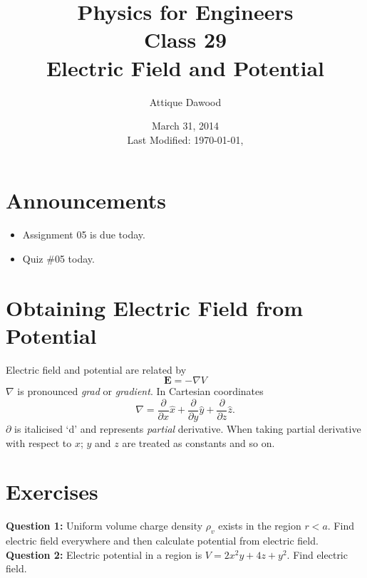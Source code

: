 \documentclass[12pt,a4paper]{article}
\title{\vspace{-3cm}Physics for Engineers\\Class 29\\Electric Field and Potential}
\author{Attique Dawood}
\date{March 31, 2014\\[0.2cm] Last Modified: \today, \currenttime}
\begin{document}
\maketitle
\section{Announcements}
\begin{itemize}
\item Assignment 05 is due today.
\item Quiz \#05 today.
\end{itemize}
\section{Obtaining Electric Field from Potential}
Electric field and potential are related by
\begin{equation}
\textbf{E}=-\nabla V
\end{equation}
$\nabla$ is pronounced \textit{grad} or \textit{gradient}. In Cartesian coordinates
\begin{equation}
\nabla=\dfrac{\partial}{\partial x}\hat x+\dfrac{\partial}{\partial y}\hat y+\dfrac{\partial}{\partial z}\hat z.
\end{equation}
$\partial$ is italicised `d' and represents \textit{partial} derivative. When taking partial derivative with respect to $x$; $y$ and $z$ are treated as constants and so on.
\section{Exercises}
\noindent\textbf{Question 1:} Uniform volume charge density $\rho_v$ exists in the region $r<a$. Find electric field everywhere and then calculate potential from electric field.\\[0.2cm]
\noindent\textbf{Question 2:} Electric potential in a region is $V=2x^2y+4z+y^2$. Find electric field.
%
%
\end{document}
